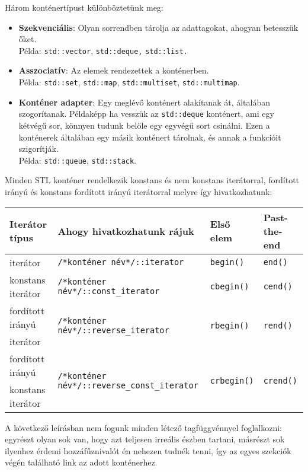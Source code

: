 \documentclass[a4paper,11.5pt,table]{article}
\begin{document}
	Három konténertípust különböztetünk meg:
	\begin{itemize}
		\item \textbf{Szekvenciális}: Olyan sorrendben tárolja az adattagokat, ahogyan betesszük őket. \\Példa: \texttt{std::vector}, \texttt{std::deque,} \texttt{std::list.}
		\item \textbf{Asszociatív}: Az elemek rendezettek a konténerben.\\ Példa: \texttt{std::set}, \texttt{std::map}, \texttt{std::multiset}, \texttt{std::multimap}.
		\item \textbf{Konténer adapter}: Egy meglévő konténert alakítanak át, általában szogorítanak. Példaképp ha vesszük az \texttt{std::deque} konténert, ami egy kétvégű sor, könnyen tudunk belőle egy egyvégű sort csinálni. Ezen a konténerek általában egy másik konténert tárolnak, és annak a funkcióit szigorítják.
		\\Példa: \texttt{std::queue}, \texttt{std::stack}.
	\end{itemize}
	Minden STL konténer rendelkezik konstans és nem konstans iterátorral, fordított irányú és konstans fordított irányú iterátorral melyre így hivatkozhatunk:
	\begin{center}
		\setlength{\extrarowheight}{2pt}
		\begin{tabular}{|l|l|l|l|}
			\hline
			Iterátor típus&Ahogy hivatkozhatunk rájuk&Első elem&Past-the-end\\
			\hline
			\hline
			iterátor&\texttt{/*konténer név*/::iterator}&\texttt{begin()}&\texttt{end()}\\
			\hline
			konstans iterátor&\texttt{/*konténer név*/::const\_iterator}&\texttt{cbegin()}&\texttt{cend()}\\
			\hline
			fordított irányú&\multirow{2}{*}{\texttt{/*konténer név*/::reverse\_iterator}}&\multirow{2}{*}{\texttt{rbegin()}}&\multirow{2}{*}{\texttt{rend()}}\\
			iterátor&&&\\
			\hline
			fordított irányú&\multirow{2}{*}{\texttt{/*konténer név*/::reverse\_const\_iterator}}&\multirow{2}{*}{\texttt{crbegin()}}&\multirow{2}{*}{\texttt{crend()}}\\
			konstans iterátor&&&\\
			\hline
		\end{tabular}
	\end{center}
	
	A következő leírásban nem fogunk minden létező tagfüggvénnyel foglalkozni: egyrészt olyan sok van, hogy azt teljesen irreális észben tartani, másrészt sok ilyenhez érdemi hozzáfűznivalót én nehezen tudnék tenni, így az egyes szekciók végén található link az adott konténerhez.
	
\end{document}
